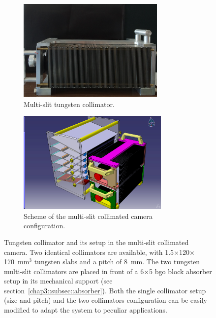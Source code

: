 \begin{figure}
\begin{subfigure}[t]{.5\textwidth}
\centering
\includegraphics[width=\linewidth, trim={0 0 0 0.5cm},clip = true, height = 5cm]{03_GraphicFiles/chapter3_CLaRySproto/Collimator/Collimator.pdf}
\caption{Multi-slit tungsten collimator.}
\label{chap3::fig::collimatorPicture}
\end{subfigure}
\begin{subfigure}[t]{.5\textwidth}
\centering
\includegraphics[width=\linewidth, trim={3cm 0 0 0},clip = true, height = 5cm]{03_GraphicFiles/chapter3_CLaRySproto/schemes/AbsoberCollimator.jpg}
\caption{Scheme of the multi-slit collimated camera configuration.}
\label{chap3::fig::collimatorScheme}
\end{subfigure}
\caption{Tungsten collimator and its setup in the multi-slit collimated camera. Two identical collimators are available, with 1.5$\times$120$\times$170~mm$\mathrm{^{3}}$ tungsten slabs  and a pitch of 8~mm. The two tungsten multi-slit collimators are placed in front of a 6$\times$5 \gls{bgo} block absorber setup in its mechanical support (see section~\ref{chap3::subsec::absorber}). Both the single collimator setup (size and pitch) and the two collimators configuration can be easily modified to adapt the system to peculiar applications.}
\label{chap3::fig::collimatorFig}
\end{figure} 



